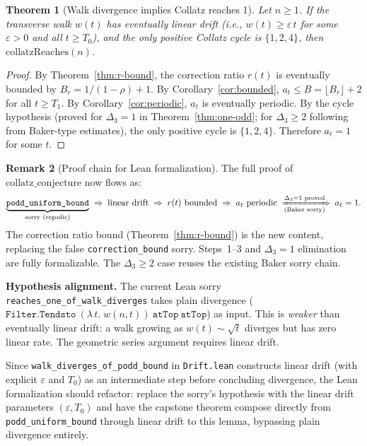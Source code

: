 \documentclass[11pt,a4paper]{article}
\theoremstyle{plain}
\newtheorem{theorem}{Theorem}[section]
\theoremstyle{definition}
\newtheorem{remark}[theorem]{Remark}
\begin{document}
\begin{theorem}[Walk divergence implies Collatz reaches 1]
\label{thm:main}
Let $n \ge 1$.  If the transverse walk $w(t)$ has eventually linear
drift (i.e., $w(t) \ge \varepsilon\, t$ for some $\varepsilon > 0$
and all $t \ge T_0$), and the only positive Collatz cycle is
$\{1, 2, 4\}$, then $\mathrm{collatzReaches}(n)$.
\end{theorem}

\begin{proof}
By Theorem~\ref{thm:r-bound}, the correction ratio $r(t)$ is
eventually bounded by $B_r = 1/(1-\rho) + 1$.  By
Corollary~\ref{cor:bounded}, $a_t \le B = \lfloor B_r \rfloor + 2$
for all $t \ge T_1$.  By Corollary~\ref{cor:periodic}, $a_t$ is
eventually periodic.  By the cycle hypothesis (proved for
$\Delta_3 = 1$ in Theorem~\ref{thm:one-odd}; for $\Delta_3 \ge 2$
following from Baker-type estimates), the only positive cycle is
$\{1, 2, 4\}$.  Therefore $a_t = 1$ for some $t$.
\end{proof}

\begin{remark}[Proof chain for Lean formalization]\label{rem:lean-chain}
The full proof of $\mathrm{collatz\_conjecture}$ now flows as:
\[
  \underbrace{\texttt{podd\_uniform\_bound}}_{\text{sorry (ergodic)}}
  \;\Rightarrow\;
  \text{linear drift}
  \;\Rightarrow\;
  r(t) \text{ bounded}
  \;\Rightarrow\;
  a_t \text{ periodic}
  \;\xRightarrow[\text{(Baker sorry)}]{\Delta_3 = 1\text{ proved}}\;
  a_t = 1.
\]
The correction ratio bound (Theorem~\ref{thm:r-bound}) is the new
content, replacing the false \texttt{correction\_bound} sorry.
Steps~1--3 and $\Delta_3 = 1$ elimination are fully formalizable.
The $\Delta_3 \ge 2$ case reuses the existing Baker sorry chain.

\medskip\noindent
\textbf{Hypothesis alignment.}\quad
The current Lean sorry \texttt{reaches\_one\_of\_walk\_diverges} takes
plain divergence
($\texttt{Filter.Tendsto}~(\lambda\, t.\; w(n,t))~\texttt{atTop}~\texttt{atTop}$)
as input.  This is \emph{weaker} than eventually linear drift: a walk
growing as $w(t) \sim \sqrt{t}$ diverges but has zero linear rate.
The geometric series argument requires linear drift.

Since \texttt{walk\_diverges\_of\_podd\_bound} in \texttt{Drift.lean}
constructs linear drift (with explicit $\varepsilon$ and $T_0$) as an
intermediate step before concluding divergence, the Lean formalization
should refactor: replace the sorry's hypothesis with the linear drift
parameters $(\varepsilon, T_0)$ and have the capstone theorem compose
directly from \texttt{podd\_uniform\_bound} through linear drift to
this lemma, bypassing plain divergence entirely.
\end{remark}
\end{document}
